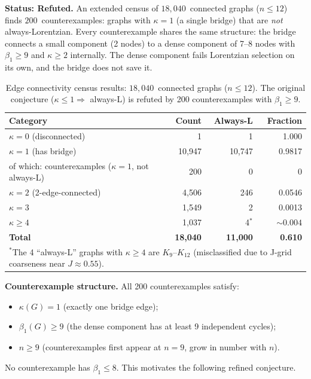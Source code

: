 \documentclass[11pt]{article}
\theoremstyle{definition}
\theoremstyle{remark}
\begin{document}
\noindent\textbf{Status: Refuted.}
An extended census of $18{,}040$~connected graphs ($n \leq 12$) finds
$200$~counterexamples: graphs with $\kappa = 1$ (a single bridge) that are
\emph{not} always-Lorentzian. Every counterexample shares the same structure:
the bridge connects a small component (2 nodes) to a dense component of 7--8
nodes with $\beta_1 \geq 9$ and $\kappa \geq 2$ internally. The dense component
fails Lorentzian selection on its own, and the bridge does not save it.

\begin{table}[htbp]
\centering
\caption{Edge connectivity census results: $18{,}040$~connected graphs ($n \leq 12$).
The original conjecture ($\kappa \leq 1 \Rightarrow$ always-L) is refuted
by 200 counterexamples with $\beta_1 \geq 9$.}
\label{tab:edge-conn-census}
\begin{tabular}{@{}lrrr@{}}
\toprule
Category & Count & Always-L & Fraction \\
\midrule
$\kappa = 0$ (disconnected) & 1 & 1 & 1.000 \\
$\kappa = 1$ (has bridge) & 10,947 & 10,747 & 0.9817 \\
\quad of which: counterexamples ($\kappa=1$, not always-L) & 200 & 0 & 0 \\
$\kappa = 2$ (2-edge-connected) & 4,506 & 246 & 0.0546 \\
$\kappa = 3$ & 1,549 & 2 & 0.0013 \\
$\kappa \geq 4$ & 1,037 & 4$^*$ & ${\sim}0.004$ \\
\midrule
\textbf{Total} & \textbf{18,040} & \textbf{11,000} & \textbf{0.610} \\
\bottomrule
\multicolumn{4}{l}{\footnotesize $^*$The 4 ``always-L'' graphs with $\kappa \geq 4$
are $K_9$--$K_{12}$ (misclassified due to J-grid coarseness near $J \approx 0.55$).}
\end{tabular}
\end{table}

\noindent\textbf{Counterexample structure.}
All 200 counterexamples satisfy:
\begin{itemize}
\item $\kappa(G) = 1$ (exactly one bridge edge);
\item $\beta_1(G) \geq 9$ (the dense component has at least 9 independent cycles);
\item $n \geq 9$ (counterexamples first appear at $n = 9$, grow in number with $n$).
\end{itemize}
No counterexample has $\beta_1 \leq 8$. This motivates the following refined conjecture.
\end{document}
